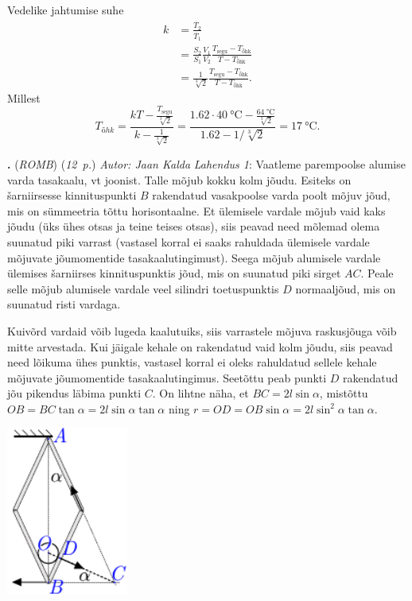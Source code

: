 \documentclass[11pt,a5paper]{article}
\newcommand{\numb}[1]{\vspace{5pt}\textbf{\large #1}}
\newcommand{\nimi}[1]{(\textsl{\small \uppercase{#1}})}
\newcommand{\punktid}[1]{(\emph{#1~p.})}
\newcounter{ylesanne}
\newcommand{\yl}[1]{\addtocounter{ylesanne}{1}\numb{\theylesanne.} \nimi{#1} \newblock{}}
\newcommand{\autor}[1]{\emph{Autor: #1}}%
\begin{document}
Vedelike jahtumise suhe
\begin{align*}
  k &= \frac{\dot{T_2}}{\dot{T_1}} \\
  &= \frac{S_2}{S_1} \frac{V_1}{V_2} \frac{T_\text{segu} - T_\text{õhk}}{T - T_\text{õhk}} \\
    &= \frac{1}{\sqrt[3]{2}}\frac{T_\text{segu} - T_\text{õhk}}{T - T_\text{õhk}}.
\end{align*}
Millest
\[
    T_{õhk} = \frac{k T - \frac{T_\text{segu}}{\sqrt[3]{2}}}{k - \frac{1}{\sqrt[3]{2}}} = \frac{\num{1.62} \cdot \SI{40}{\celsius} - \frac{\SI{64}{\celsius}}{\sqrt[3]{2}}}{\num{1.62} - 1/\sqrt[3]{2}} = \SI{17}{\celsius}.
\]




\newpage
\yl{Romb}
\punktid{12} \autor{Jaan Kalda}
\textit{Lahendus 1}: Vaatleme parempoolse alumise varda tasakaalu, vt joonist. Talle mõjub kokku kolm jõudu. Esiteks on šarniirsesse kinnituspunkti $B$ rakendatud vasakpoolse varda poolt mõjuv jõud, mis on sümmeetria tõttu horisontaalne. Et ülemisele vardale mõjub vaid kaks jõudu (üks ühes otsas ja teine teises otsas), siis peavad need mõlemad olema suunatud piki varrast (vastasel korral ei saaks rahuldada ülemisele vardale mõjuvate  jõumomentide tasakaalutingimust). Seega mõjub alumisele vardale ülemises šarniirses kinnituspunktis jõud, mis on suunatud piki sirget $AC$. Peale selle mõjub alumisele vardale veel silindri toetuspunktis $D$ normaaljõud, mis on suunatud risti vardaga.

Kuivõrd vardaid võib lugeda kaalutuiks, siis varrastele mõjuva raskusjõuga võib mitte arvestada. Kui jäigale kehale on rakendatud vaid kolm jõudu, siis peavad need lõikuma ühes punktis, vastasel korral ei oleks rahuldatud sellele kehale mõjuvate  jõumomentide tasakaalutingimus. Seetõttu peab punkti $D$ rakendatud jõu pikendus läbima punkti $C$. On lihtne näha, et $BC=2l\sin\alpha$, mistõttu $OB=BC\tan\alpha=2l\sin\alpha\tan\alpha$ ning $r=OD=OB\sin\alpha=2l\sin^2\alpha\tan\alpha$.
\begin{center}
  \includegraphics[width=0.3\textwidth]{romb-pall-lah.pdf}
\end{center}
\end{document}
